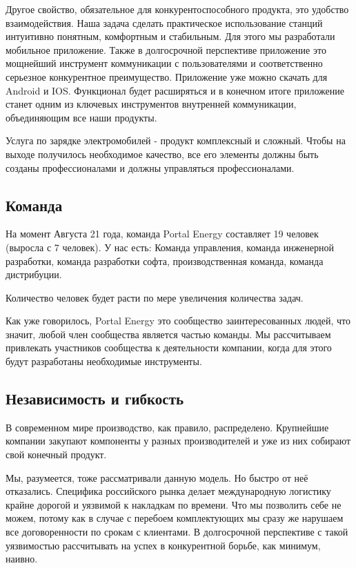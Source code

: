 \documentclass[a4paper,12pt]{report}
\begin{document}
Другое свойство, обязательное для конкурентоспособного продукта, это удобство взаимодействия. Наша задача сделать практическое использование станций интуитивно понятным, комфортным и стабильным. Для этого мы разработали мобильное приложение. Также в долгосрочной перспективе приложение это мощнейший инструмент коммуникации с пользователями и соответственно серьезное конкурентное преимущество. Приложение уже можно скачать для Android и IOS. Функционал будет расширяться и в конечном итоге приложение станет одним из ключевых инструментов внутренней коммуникации, объединяющим все наши продукты. 

Услуга по зарядке электромобилей - продукт комплексный и сложный. Чтобы на выходе получилось необходимое качество, все его элементы должны быть созданы профессионалами и должны управляться профессионалами. 


\subsection{Команда}

На момент Августа 21 года, команда Portal Energy составляет 19 человек (выросла с 7 человек). У нас есть:
Команда управления, 
команда инженерной разработки, 
команда разработки софта, 
производственная команда,
команда дистрибуции. 

Количество человек будет расти по мере увеличения количества задач. 

Как уже говорилось, Portal Energy это сообщество заинтересованных людей, что значит, любой член сообщества является частью команды. Мы рассчитываем привлекать участников сообщества к деятельности компании, когда для этого будут разработаны необходимые инструменты.

\subsection{Независимость и гибкость}

В современном мире производство, как правило, распределено. Крупнейшие компании закупают компоненты у разных производителей и уже из них собирают свой конечный продукт. 

Мы, разумеется, тоже рассматривали данную модель. Но быстро от неё отказались. Специфика российского рынка делает международную логистику крайне дорогой и уязвимой к накладкам по времени. Что мы позволить себе не можем, потому как в случае с перебоем комплектующих мы сразу же нарушаем все договоренности по срокам с клиентами. В долгосрочной перспективе с такой уязвимостью рассчитывать на успех в конкурентной борьбе, как минимум, наивно. 
\end{document}
